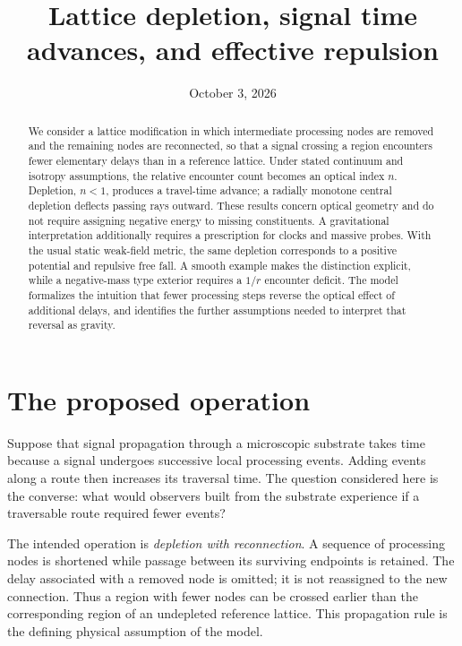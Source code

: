 \documentclass[aps,prd,reprint,nofootinbib]{revtex4-2}
\begin{document}
\title{Lattice depletion, signal time advances, and effective repulsion}
\date{October 3, 2026}

\begin{abstract}
We consider a lattice modification in which intermediate processing nodes
are removed and the remaining nodes are reconnected, so that a signal
crossing a region encounters fewer elementary delays than in a reference
lattice. Under stated continuum and isotropy assumptions, the relative
encounter count becomes an optical index $n$. Depletion, $n<1$, produces
a travel-time advance; a radially monotone central depletion deflects
passing rays outward. These results concern optical geometry and do not require
assigning negative energy to missing constituents. A gravitational
interpretation additionally requires a prescription for clocks and
massive probes. With the usual static weak-field metric, the same
depletion corresponds to a positive potential and repulsive free fall.
A smooth example makes the distinction explicit, while a negative-mass
type exterior requires a $1/r$ encounter deficit. The model formalizes
the intuition that fewer processing steps reverse the optical effect
of additional delays, and identifies the further assumptions needed to
interpret that reversal as gravity.
\end{abstract}

\maketitle

\section{The proposed operation}
\label{sec:operation}

Suppose that signal propagation through a microscopic substrate takes
time because a signal undergoes successive local processing events.
Adding events along a route then increases its traversal time. The
question considered here is the converse: what would observers built
from the substrate experience if a traversable route required fewer
events?

The intended operation is \emph{depletion with reconnection}. A sequence
of processing nodes is shortened while passage between its surviving
endpoints is retained. The delay associated with a removed node is
omitted; it is not reassigned to the new connection. Thus a region with
fewer nodes can be crossed earlier than the corresponding region of an
undepleted reference lattice. This propagation rule is the defining
physical assumption of the model.
\end{document}
